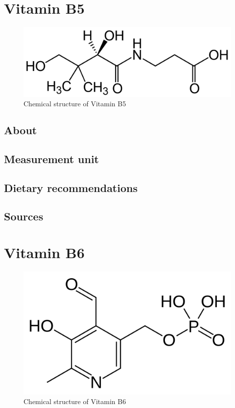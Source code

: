 \documentclass{book}
\begin{document}
\chapter{Vitamin B5}
\begin{figure}[h]
	\centering \includegraphics[width=0.75\linewidth]{images/Vitamin_B5_chemical_structure}
	\caption{Chemical structure of Vitamin B5}
\end{figure}

\section{About}


\section{Measurement unit}


\section{Dietary recommendations}


\section{Sources}


\chapter{Vitamin B6}
\begin{figure}[h]
	\centering \includegraphics[width=0.75\linewidth]{images/Vitamin_B6_chemical_structure}
	\caption{Chemical structure of Vitamin B6}
\end{figure}
\end{document}

